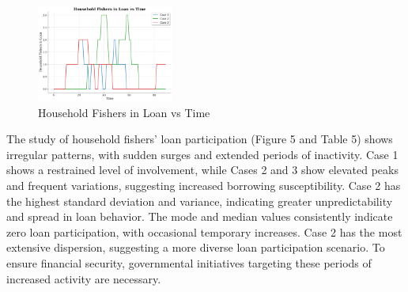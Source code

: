 \documentclass[final,5p,times,twocolumn,authoryear]{elsarticle}
\begin{document}
\begin{figure}[htbp]
    \centering
    \includegraphics[width=0.4\textwidth]{graph_all/plots_fav/household_fishers_in_loan_vs_time.png}
    \caption{Household Fishers in Loan vs Time}
    \label{fig:household_loan}
\end{figure}
\begin{table}[htbp]
    \centering
    \caption{Household Fishers in Loan - Statistical Analysis}
\end{table}
The study of household fishers' loan participation (Figure 5 and Table 5) shows irregular patterns, with sudden surges and extended periods of inactivity. Case 1 shows a restrained level of involvement, while Cases 2 and 3 show elevated peaks and frequent variations, suggesting increased borrowing susceptibility. Case 2 has the highest standard deviation and variance, indicating greater unpredictability and spread in loan behavior. The mode and median values consistently indicate zero loan participation, with occasional temporary increases. Case 2 has the most extensive dispersion, suggesting a more diverse loan participation scenario. To ensure financial security, governmental initiatives targeting these periods of increased activity are necessary.\\
\end{document}
